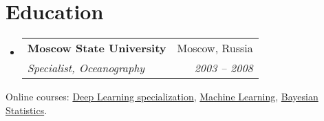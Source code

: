\documentclass[letterpaper,11pt]{article}
\makeatletter
\newcommand{\resumeSubheading}[4]{
  \vspace{-1pt}\item
    \begin{tabular*}{0.97\textwidth}[t]{l@{\extracolsep{\fill}}r}
      \textbf{#1} & #2 \\
      \textit{\small#3} & \textit{\small #4} \\
    \end{tabular*}\vspace{+1pt}
}
\newcommand{\resumeSubHeadingListStart}{\begin{itemize}[leftmargin=*]}
\newcommand{\resumeSubHeadingListEnd}{\end{itemize}}
\makeatother
\begin{document}
\section{Education}
  \resumeSubHeadingListStart
    \resumeSubheading
      {Moscow State University}{Moscow, Russia}
      {Specialist, Oceanography}{2003 -- 2008}
  \resumeSubHeadingListEnd
  
  Online courses:
  {\href{https://coursera.org/share/738f07c3514e74b4b4a2ec4c7df53d11}{Deep Learning specialization},
   \href{https://coursera.org/share/a7e216966ca1e16fd6c58b7d58cb0806}{Machine Learning},
   \href{https://coursera.org/share/2a20ba63d42f5a2557db34e3e9837382}{Bayesian Statistics}.}

\end{document}
